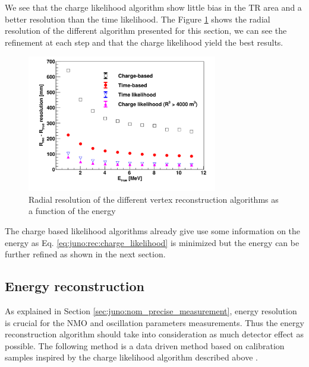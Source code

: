 \documentclass[../main.tex]{subfiles}
\begin{document}
We see that the charge likelihood algorithm show little bias in the TR area and a better resolution than the time likelihood. The Figure \ref{fig:juno:rec:all_class} shows the radial resolution of the different algorithm presented for this section, we can see the refinement at each step and that the charge likelihood yield the best results.

\begin{figure}[ht]
  \centering
  \includegraphics[height=6cm]{images/juno/reco/vertex_reco_classique.png}
  \caption{Radial resolution of the different vertex reconstruction algorithms as a function of the energy}
  \label{fig:juno:rec:all_class}
\end{figure}

The charge based likelihood algorithms already give use some information on the energy as Eq. \ref{eq:juno:rec:charge_likelihood} is minimized but the energy can be further refined as shown in the next section.


\subsection{Energy reconstruction}

As explained in Section \ref{sec:juno:nom_precise_measurement}, energy resolution is crucial for the NMO and oscillation parameters measurements. Thus the energy reconstruction algorithm should take into consideration as much detector effect as possible. The following method is a data driven method based on calibration samples inspired by the charge likelihood algorithm described above \cite{huang_data-driven_2023}.
\end{document}
